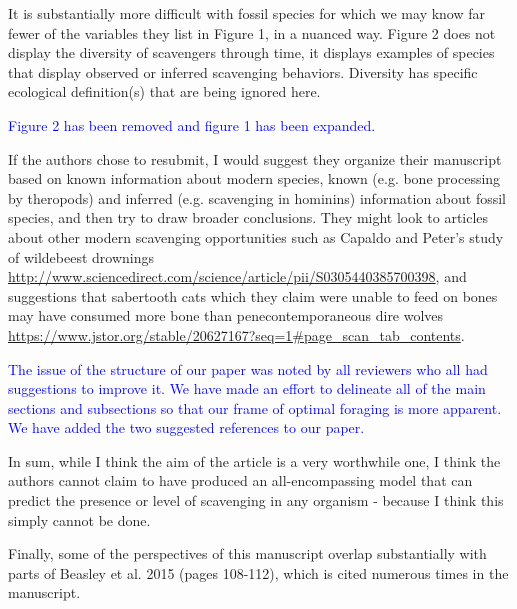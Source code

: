 \documentclass[12pt,letterpaper]{article}
\begin{document}
It is substantially more difficult with fossil species for which we may know far fewer of the variables they list in Figure 1, in a nuanced way.
Figure 2 does not display the diversity of scavengers through time, it displays examples of species that display observed or inferred scavenging behaviors.
Diversity has specific ecological definition(s) that are being ignored here.
\bigskip

\textcolor{blue}{Figure 2 has been removed and figure 1 has been expanded.}

\bigskip

If the authors chose to resubmit, I would suggest they organize their manuscript based on known information about modern species, known (e.g. bone processing by theropods) and inferred (e.g. scavenging in hominins) information about fossil species, and then try to draw broader conclusions.
They might look to articles about other modern scavenging opportunities such as Capaldo and Peter's study of wildebeest drownings \url{http://www.sciencedirect.com/science/article/pii/S0305440385700398}, and suggestions that sabertooth cats which they claim were unable to feed on bones may have consumed more bone than penecontemporaneous dire wolves \url{https://www.jstor.org/stable/20627167?seq=1#page_scan_tab_contents}. 

\bigskip

\textcolor{blue}{The issue of the structure of our paper was noted by all reviewers who all had suggestions to improve it. 
We have made an effort to delineate all of the main sections and subsections so that our frame of optimal foraging is more apparent.
We have added the two suggested references to our paper.}

\bigskip
In sum, while I think the aim of the article is a very worthwhile one, I think the authors cannot claim to have produced an all-encompassing model that can predict the presence or level of scavenging in any organism - because I think this simply cannot be done.


Finally, some of the perspectives of this manuscript overlap substantially with parts of Beasley et al. 2015 (pages 108-112), which is cited numerous times in the manuscript.
\bigskip
\end{document}
